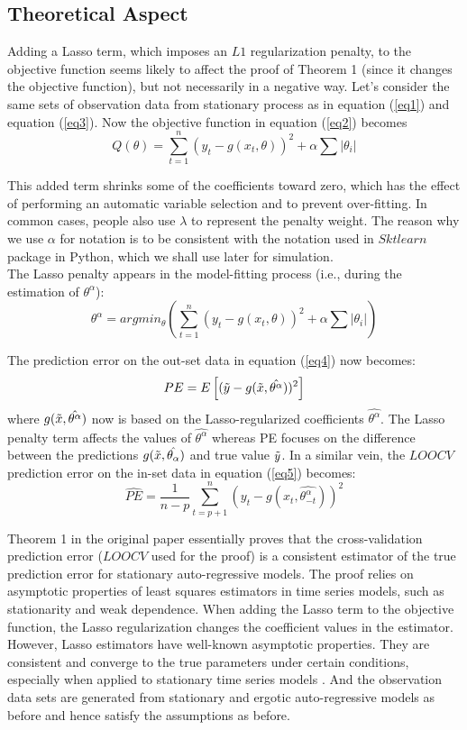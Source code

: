 \documentclass[12pt, oneside]{amsart}
\theoremstyle{definition}
\theoremstyle{remark}
\numberwithin{equation}{section}
\begin{document}
\subsection{Theoretical Aspect}
Adding a Lasso term, which imposes an $L1$ regularization penalty, to the objective function seems likely to affect the proof of Theorem 1 (since it changes the objective function), but not necessarily in a negative way. Let's consider the same sets of observation data from stationary process as in equation (\ref{eq1}) and equation (\ref{eq3}). Now the objective function in equation (\ref{eq2}) becomes 
$$Q(\theta) = \sum^n_{t=1} (y_t - g(x_t, \theta))^2 + \alpha \sum |\theta_i|
$$ 

This added term shrinks some of the coefficients toward zero, which has the effect of performing an automatic variable selection and to prevent over-fitting. In common cases, people also use $\lambda$ to represent the penalty weight. The reason why we use $\alpha$ for notation is to be consistent with the notation used in $Sktlearn$ package in Python, which we shall use later for simulation.\\

The Lasso penalty appears in the model-fitting process (i.e., during the estimation of $\theta^\alpha$):
$$\theta^\alpha = arg min_\theta \left( \sum^n_{t=1} (y_t - g(x_t, \theta))^2 + \alpha \sum |\theta_i| \right)$$

The prediction error on the out-set data in equation (\ref{eq4}) now becomes: 
\begin{equation}\label{eq7}
    PE = E\left[(\Tilde{y} - g(\Tilde{x},\hat{\theta^\alpha}))^2\right]
\end{equation}
where $g(\Tilde{x},\hat{\theta^\alpha})$ now is based on the Lasso-regularized coefficients $\hat{\theta^\alpha}$. The Lasso penalty term affects the values of $\hat{\theta^\alpha}$ whereas PE focuses on the difference between the predictions $g(\Tilde{x},\hat{\theta_\alpha})$ and true value $\Tilde{y}$. In a similar vein, the $LOOCV$ prediction error on the in-set data in equation (\ref{eq5}) becomes: 
\begin{equation}\label{eq8}
\hat{PE} = \frac{1}{n-p} \sum_{t=p+1}^n \left( y_t - g(x_t,\hat{\theta^\alpha_{-t}}) \right)^2
\end{equation}

Theorem 1 in the original paper essentially proves that the cross-validation prediction error ($LOOCV$ used for the proof) is a consistent estimator of the true prediction error for stationary auto-regressive models. The proof relies on asymptotic properties of least squares estimators in time series models, such as stationarity and weak dependence. When adding the Lasso term to the objective function, the Lasso regularization changes the coefficient values in the estimator. However, Lasso estimators have well-known asymptotic properties. They are consistent and converge to the true parameters under certain conditions, especially when applied to stationary time series models \citep{Tibshirani}. And the observation data sets are generated from stationary and ergotic auto-regressive models as before and hence satisfy the assumptions as before.\\
\end{document}
